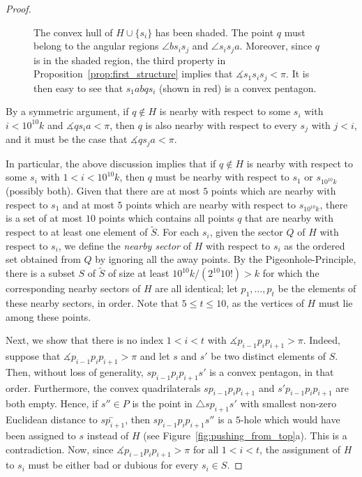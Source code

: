 \documentclass[10pt,a4paper]{amsart}
\begin{document}
\begin{proof}
\begin{figure}[h]
    \centering
    
    \caption{The convex hull of $H\cup\{s_i\}$ has been shaded. The point $q$ must belong to the angular regions $\angle bs_is_j$ and $\angle s_is_ja$. Moreover, since $q$ is in the shaded region, the third property in Proposition~\ref{prop:first_structure} implies that $\measuredangle s_1s_is_j<\pi$. It is then easy to see that $s_1abqs_i$ (shown in red) is a convex pentagon.}
    \label{fig:s1sisj}
\end{figure}

By a symmetric argument, if $q\not\in H$ is nearby with respect to some $s_i$ with $i<10^{10}k$ and $\measuredangle qs_ia<\pi$, then $q$ is also nearby with respect to every $s_j$ with $j<i$, and it must be the case that $\measuredangle qs_ja<\pi$.

In particular, the above discussion implies that if $q\not\in H$ is nearby with respect to some $s_i$ with $1<i<10^{10}k$, then $q$ must be nearby with respect to $s_1$ or $s_{10^{10}k}$ (possibly both). Given that there are at most $5$ points which are nearby with respect to $s_1$ and at most $5$ points which are nearby with respect to $s_{10^{10}k}$, there is a set of at most $10$ points which contains all points $q$ that are nearby with respect to at least one element of $\tilde S$. For each $s_i$, given the sector $Q$ of $H$ with respect to $s_i$, we define the \textit{nearby sector} of $H$ with respect to $s_i$ as the ordered set obtained from $Q$ by ignoring all the away points. By the Pigeonhole-Principle, there is a subset $ S$ of $\tilde S$ of size at least $10^{10}k/(2^{10}10!)>k$ for which the corresponding nearby sectors of $H$ are all identical; let $p_1,\dots,p_t$ be the elements of these nearby sectors, in order. Note that $5\leq t\leq 10$, as the vertices of $H$ must lie among these points.

Next, we show that there is no index $1<i<t$ with $\measuredangle p_{i-1}p_ip_{i+1}>\pi$. Indeed, suppose that $\measuredangle p_{i-1}p_ip_{i+1}>\pi$ and let $s$ and $s'$ be two distinct elements of $S$. Then, without loss of generality, $sp_{i-1}p_ip_{i+1}s'$ is a convex pentagon, in that order. Furthermore, the convex quadrilaterals $sp_{i-1}p_ip_{i+1}$ and $s'p_{i-1}p_ip_{i+1}$ are both empty. Hence, if $s''\in P$ is the point in $\triangle sp_{i+1}s'$ with smallest non-zero Euclidean distance to $\overleftrightarrow{sp_{i+1}}$, then $sp_{i-1}p_ip_{i+1}s''$ is a $5$-hole which would have been assigned to $s$ instead of $H$ (see Figure~\ref{fig:pushing_from_top}a). This is a contradiction. Now, since $\measuredangle p_{i-1}p_ip_{i+1}>\pi$ for all $1<i<t$, the assignment of $H$ to $s_i$ must be either bad or dubious for every $s_i\in S$.


\end{proof}
\end{document}
